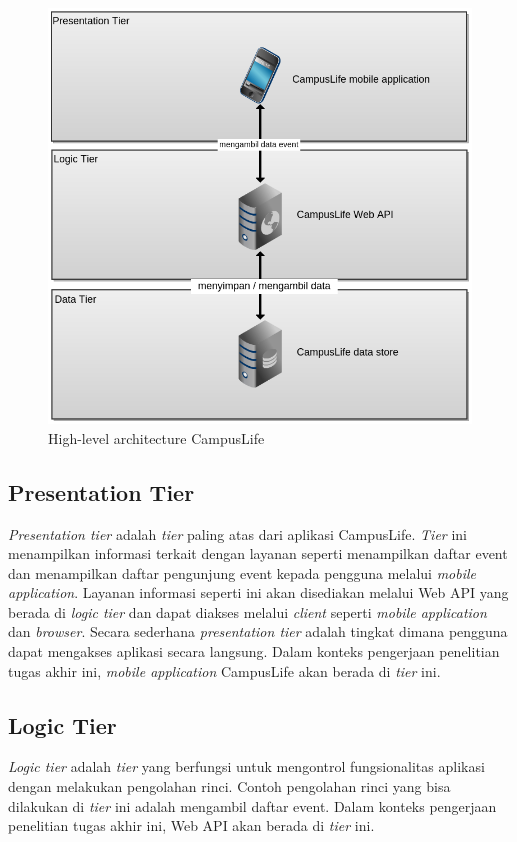 \documentclass[a4paper, 12pt]{report}
\begin{document}
\begin{figure}[htp]
\centering
\includegraphics[scale=0.40]{images/test.png}
\caption{High-level architecture CampusLife}
\label{High-level architecture CampusLife}
\end{figure}

\subsection{Presentation Tier}
\onehalfspacing \textit{Presentation tier} adalah \textit{tier} paling atas dari aplikasi CampusLife. \textit{Tier} ini menampilkan informasi terkait dengan layanan seperti menampilkan daftar event dan menampilkan daftar pengunjung event kepada pengguna melalui \textit{mobile application}. Layanan informasi seperti ini akan disediakan melalui Web API yang berada di \textit{logic tier} dan dapat diakses melalui \textit{client} seperti \textit{mobile application} dan \textit{browser}. Secara sederhana \textit{presentation tier} adalah tingkat dimana pengguna dapat mengakses aplikasi secara langsung. Dalam konteks pengerjaan penelitian tugas akhir ini, \textit{mobile application} CampusLife akan berada di \textit{tier} ini\cite{multitier-architecture-wikipedia}.

\subsection{Logic Tier}
\onehalfspacing \textit{Logic tier} adalah \textit{tier} yang berfungsi untuk mengontrol fungsionalitas aplikasi dengan melakukan pengolahan rinci. Contoh pengolahan rinci yang bisa dilakukan di \textit{tier} ini adalah mengambil daftar event. Dalam konteks pengerjaan penelitian tugas akhir ini, Web API akan berada di \textit{tier} ini\cite{multitier-architecture-wikipedia}.
\end{document}
